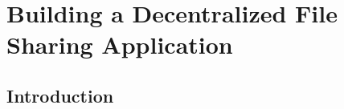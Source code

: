 \chapter{Building a Decentralized File Sharing Application}\label{chapter:building-dapp}

	\section{Introduction}